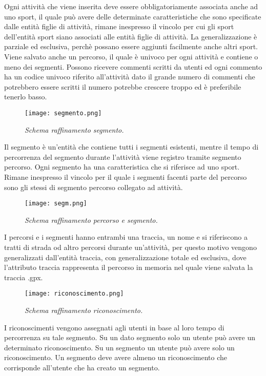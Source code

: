 \documentclass[12pt]{report}
\begin{document}
Ogni attività che viene inserita deve essere obbligatoriamente associata anche ad uno sport, 
il quale può avere delle determinate caratteristiche che sono specificate dalle entità figlie di 
attività, rimane inespresso il vincolo per cui gli sport dell'entità sport siano associati 
alle entità figlie di attività. La generalizzazione è parziale ed esclusiva, perchè possano essere aggiunti
facilmente anche altri sport. Viene salvato anche un percorso, il quale è univoco per ogni attività
e contiene o meno dei segmenti. Possono ricevere commenti scritti da utenti ed ogni commento ha un codice
univoco riferito all'attività dato il grande numero di commenti che potrebbero essere scritti
il numero potrebbe crescere troppo ed è preferibile tenerlo basso.

\begin{figure}[H]
    \texttt{[image: segmento.png]}
    \centering
    \caption{\emph{Schema raffinamento segmento.}}
    \label{img:schema_segmento}
\end{figure}

Il segmento è un'entità che contiene tutti i segmenti esistenti, mentre il tempo di percorrenza
del segmento durante l'attività viene registro tramite segmento percorso. 
Ogni segmento ha una caratteristica che si riferisce ad uno sport.
Rimane inespresso il vincolo per il quale i segmenti facenti parte del percorso sono gli stessi
di segmento percorso collegato ad attività.

\begin{figure}[H]
    \texttt{[image: segm.png]}
    \centering
    \caption{\emph{Schema raffinamento percorso e segmento.}}
    \label{img:schema_perc_seg}
\end{figure}

I percorsi e i segmenti hanno entrambi una traccia, un nome e si riferiscono a tratti di strada od 
altro percorsi durante un'attività, per questo motivo vengono generalizzati dall'entità traccia,
con generalizzazione totale ed esclusiva, dove l'attributo traccia rappresenta il percorso in memoria
nel quale viene salvata la traccia .gpx.

\begin{figure}[H]
    \texttt{[image: riconoscimento.png]}
    \centering
    \caption{\emph{Schema raffinamento riconoscimento.}}
    \label{img:schema_riconoscimento}
\end{figure}

I riconoscimenti vengono assegnati agli utenti in base al loro tempo di percorrenza su tale segmento.
Su un dato segmento solo un utente può avere un determinato riconoscimento. Su un segmento un utente
può avere solo un riconoscimento. Un segmento deve avere almeno un riconoscimento che corrisponde
all'utente che ha creato un segmento.
\end{document}
